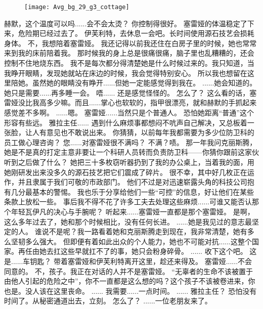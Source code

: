 \documentclass[openany]{book}
\begin{document}
\begin{figure}[h]
    \centering
    \texttt{[image: Avg\_bg\_29\_g3\_cottage]}
\end{figure}
\begin{dialogue}
     赫默，这个温度可以吗......会不会太烫？
     你控制得很好。
     塞雷娅的体温稳定了下来，危险期已经过去了。
     伊芙利特，去休息一会吧。长时间使用源石技艺会损耗身体。
     不，我想陪着塞雷娅。
     我还记得以前我还住在白房子里的时候，她也常常来到我的床前陪着我。
     那时候我的身上总是很痛很痛，脑子里也乱糟糟的，还会控制不住地烧东西。
     我不是每次都分得清楚她是什么时候过来的。我只知道，当我睁开眼睛，发现她就站在床边的时候，我会觉得特别安心。
     所以我也想留在这里陪她。虽然她的眼睛没有睁开......但她一定能感觉得到我在。
     ......她会知道的。
     她只是需要......再多睡一会。
     唔......
     还是感觉怪怪的。
     怎么了？
     这么看的话，塞雷娅没比我高多少嘛。而且......掌心也软软的，指甲很漂亮，就和赫默的手抓起来感觉差不多啊。
     ......嗯。
     塞雷娅......当然只是个普通人。
     恐怕她距离“普通”这个形容有些远。
     雅拉主任......
     遇到什么麻烦事都想闷不吭声自己解决，又总板着一张脸，让人有意见也不敢说出来。
     你猜猜，以前每年我都需要为多少位防卫科的员工做心理咨询？
     您......对塞雷娅很不满吗？
     不满？啧。
     那一年我问克丽斯腾，她是不是真的打定主意非要让一个科研人员转而负责防卫科——你猜你跟前这家伙听到之后做了什么？
     她把三十多枚窃听器扔到了我的办公桌上，当着我的面，用她刚研发出来没多久的源石技艺把它们震成了碎片。
     很不幸，其中好几枚正在运作，并且隶属于我们可敬的市政部门。
     他们不过是对迅速崭露头角的科技公司抱有几分最基本的警惕。
     我也乐于分享给他们一些“可控”的信息，好让他们在某些条款上放松一些。
     事后我不得不花了许多工夫去处理这些麻烦......可谁又能否认那个年轻瓦伊凡的决心与手腕呢？
     听起来......塞雷娅一直都是那个塞雷娅。
     是啊，这么多年过去了，她和那个时候相比，没有任何长进。
     ......她是我见过的意志最坚定的人。
     谁说不是呢？我一路看着她和克丽斯腾走到现在，我非常清楚，她有多么坚韧多么强大。
     但即便有着如此出众的个人能力，她也不可能对抗......这整个国家。再任由她去扛这些早就扛不了的事，她只会粉身碎骨。
     ......
     收下这个吧。
     这是......车钥匙？
     带着塞雷娅和伊芙利特离开这里，趁还来得及。
     塞雷娅......不会同意的。
     不，孩子。我正在对话的人并不是塞雷娅。
     “无辜者的生命不该被置于由他人引起的危险之中”，你不一直都是这么想的吗？这个孩子不该被卷进来，你也是。没人该在这里丧命。
     ......
     我需要......一点时间。
     ......
     雅拉主任？
     恐怕没有时间了。从秘密通道出去，立刻。
     怎么了？
     ......一位老朋友来了。
\end{dialogue}
\end{document}
